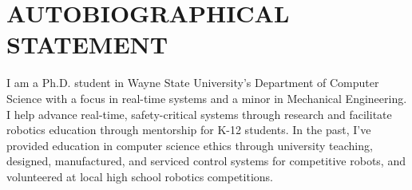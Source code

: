 \section*{AUTOBIOGRAPHICAL STATEMENT}
%
I am a Ph.D. student in Wayne State University's Department of Computer Science with a focus in real-time systems and a minor in Mechanical Engineering.
I help advance real-time, safety-critical systems through research
and facilitate robotics education through mentorship for K-12 students.
In the past, I've provided education in computer science ethics through university teaching,
designed, manufactured, and serviced control systems for competitive robots,
and volunteered at local high school robotics competitions.
